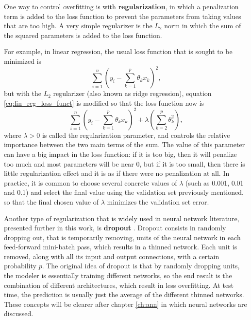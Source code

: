 One way to control overfitting is with \textbf{regularization}, in which a penalization term is added to the loss function to prevent the parameters from taking values that are too high. A very simple regularizer is the $L_2$ norm in which the sum of the squared parameters is added to the loss function.

For example, in linear regression, the usual loss function that is sought to be minimized is
\begin{equation}
  \label{eq:lin_reg_loss_funct}
  \sum_{i = 1}^n{ \left( y_i - \sum_{k = 1}^p  \theta_k x_k \right) ^ 2},
\end{equation}
but with the $L_2$ regularizer (also known as ridge regression), equation \eqref{eq:lin_reg_loss_funct} is modified so that the loss function now is
\begin{equation}
  \label{eq:lin_reg_loss_funct_reg}
  \sum_{i = 1}^n{ \left( y_i - \sum_{k = 1}^p \theta_k x_k \right) ^ 2}
  + \lambda \left( \sum_{k = 2}^p \theta_k^2 \right),
\end{equation}
where $\lambda > 0$ is called the regularization parameter, and controls the relative importance between the two main terms of the sum. The value of this parameter can have a big impact in the loss function: if it is too big, then it will penalize too much and most parameters will be near 0, but if it is too small, then there is little regularization effect and it is as if there were no penalization at all. In practice, it is common to choose several concrete values of $\lambda$ (such as 0.001, 0.01 and 0.1) and select the final value using the validation set previously mentioned, so that the final chosen value of $\lambda$ minimizes the validation set error.

Another type of regularization that is widely used in neural network literature, presented further in this work, is \textbf{dropout} \cite{srivastava2014dropout}. Dropout consists in randomly dropping out, that is temporarily removing, units of the neural network in each feed-forward mini-batch pass, which results in a thinned network. Each unit is removed, along with all its input and output connections, with a certain probability $p$. The original idea of dropout is that by randomly dropping units, the modeler is essentially training different networks, so the end result is the combination of different architectures, which result in less overfitting. At test time, the prediction is usually just the average of the different thinned networks. These concepts will be clearer after chapter \ref{ch:ann} in which neural networks are discussed.
